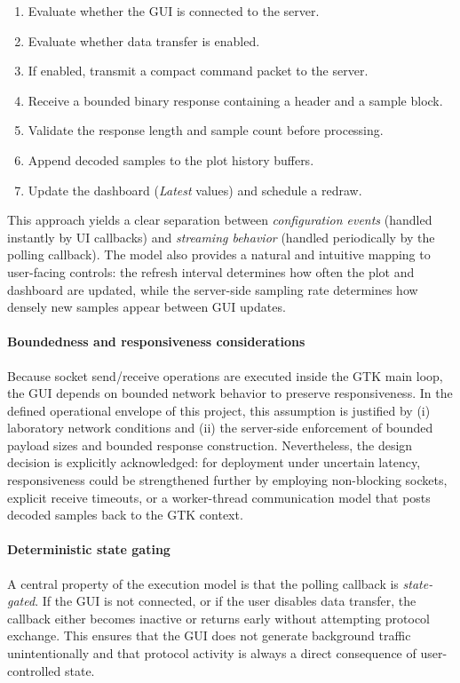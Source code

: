 \begin{enumerate}
	\item Evaluate whether the GUI is connected to the server.
	\item Evaluate whether data transfer is enabled.
	\item If enabled, transmit a compact command packet to the server.
	\item Receive a bounded binary response containing a header and a sample block.
	\item Validate the response length and sample count before processing.
	\item Append decoded samples to the plot history buffers.
	\item Update the dashboard (\emph{Latest} values) and schedule a redraw.
\end{enumerate}

This approach yields a clear separation between \emph{configuration events} (handled instantly by UI callbacks) and \emph{streaming behavior} (handled periodically by the polling callback). The model also provides a natural and intuitive mapping to user-facing controls: the refresh interval determines how often the plot and dashboard are updated, while the server-side sampling rate determines how densely new samples appear between GUI updates.

\paragraph{Boundedness and responsiveness considerations}
Because socket send/receive operations are executed inside the GTK main loop, the GUI depends on bounded network behavior to preserve responsiveness. In the defined operational envelope of this project, this assumption is justified by (i) laboratory network conditions and (ii) the server-side enforcement of bounded payload sizes and bounded response construction. Nevertheless, the design decision is explicitly acknowledged: for deployment under uncertain latency, responsiveness could be strengthened further by employing non-blocking sockets, explicit receive timeouts, or a worker-thread communication model that posts decoded samples back to the GTK context.

\paragraph{Deterministic state gating}
A central property of the execution model is that the polling callback is \emph{state-gated}. If the GUI is not connected, or if the user disables data transfer, the callback either becomes inactive or returns early without attempting protocol exchange. This ensures that the GUI does not generate background traffic unintentionally and that protocol activity is always a direct consequence of user-controlled state.

